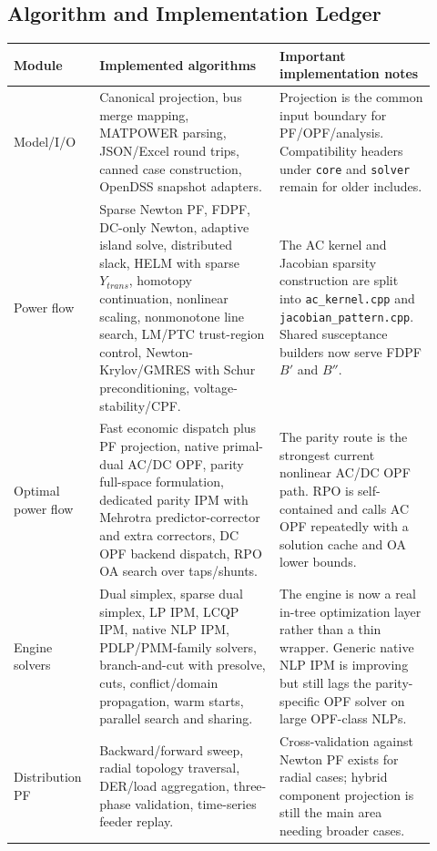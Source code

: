 \subsection{Algorithm and Implementation Ledger}

\begin{longtable}{@{}L{0.18\linewidth}L{0.40\linewidth}L{0.34\linewidth}@{}}
\toprule
Module & Implemented algorithms & Important implementation notes \\
\midrule
\endhead
Model/I/O & Canonical projection, bus merge mapping, MATPOWER parsing, JSON/Excel round trips, canned case construction, OpenDSS snapshot adapters. & Projection is the common input boundary for PF/OPF/analysis.  Compatibility headers under \texttt{core} and \texttt{solver} remain for older includes. \\
Power flow & Sparse Newton PF, FDPF, DC-only Newton, adaptive island solve, distributed slack, HELM with sparse \(Y_{trans}\), homotopy continuation, nonlinear scaling, nonmonotone line search, LM/PTC trust-region control, Newton-Krylov/GMRES with Schur preconditioning, voltage-stability/CPF. & The AC kernel and Jacobian sparsity construction are split into \texttt{ac\_kernel.cpp} and \texttt{jacobian\_pattern.cpp}.  Shared susceptance builders now serve FDPF \(B'\) and \(B''\). \\
Optimal power flow & Fast economic dispatch plus PF projection, native primal-dual AC/DC OPF, parity full-space formulation, dedicated parity IPM with Mehrotra predictor-corrector and extra correctors, DC OPF backend dispatch, RPO OA search over taps/shunts. & The parity route is the strongest current nonlinear AC/DC OPF path.  RPO is self-contained and calls AC OPF repeatedly with a solution cache and OA lower bounds. \\
Engine solvers & Dual simplex, sparse dual simplex, LP IPM, LCQP IPM, native NLP IPM, PDLP/PMM-family solvers, branch-and-cut with presolve, cuts, conflict/domain propagation, warm starts, parallel search and sharing. & The engine is now a real in-tree optimization layer rather than a thin wrapper.  Generic native NLP IPM is improving but still lags the parity-specific OPF solver on large OPF-class NLPs. \\
Distribution PF & Backward/forward sweep, radial topology traversal, DER/load aggregation, three-phase validation, time-series feeder replay. & Cross-validation against Newton PF exists for radial cases; hybrid component projection is still the main area needing broader cases. \\

\end{longtable}
